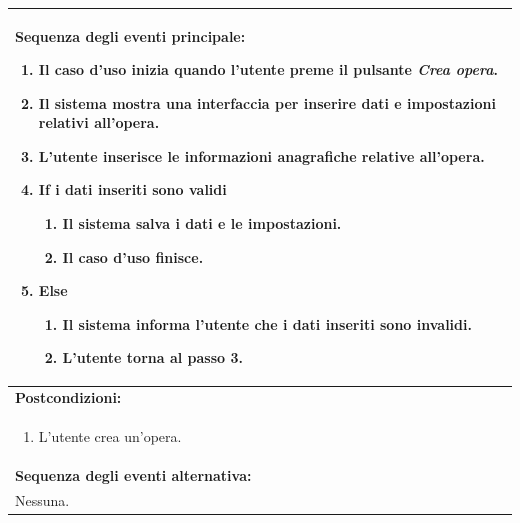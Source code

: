 \documentclass{article}
\begin{document}
\begin{table}[H]
\begin{tabular}{|p{\linewidth}|}
                        \hline
                        \textbf{Sequenza degli eventi principale:}
                        \begin{enumerate}
                            \item Il caso d'uso inizia quando l'utente preme il pulsante \emph{Crea opera}.
                            \item Il sistema mostra una interfaccia per inserire dati e impostazioni relativi all'opera. %
                            \item L'utente inserisce le informazioni anagrafiche relative all'opera.
                            \item \textbf{If} i dati inseriti sono validi
                            \begin{enumerate}
                                \item Il sistema salva i dati e le impostazioni.
                                \item Il caso d'uso finisce.
                            \end{enumerate}
                            \item \textbf{Else}
                            \begin{enumerate}
                                \item Il sistema informa l'utente che i dati inseriti sono invalidi.
                                \item L'utente torna al passo 3.
                            \end{enumerate}
                        \end{enumerate} \\
                        \hline
                        \cellcolor{gray!20}
                        \textbf{Postcondizioni:} \\
                        \cellcolor{gray!20}
                        \begin{minipage}{\linewidth}
                            \begin{enumerate}
                                \item L'utente crea un'opera.
                            \end{enumerate}
                        \end{minipage}
                        \vspace{-10pt} \\
                        \hline
                        \textbf{Sequenza degli eventi alternativa:} \\
                        Nessuna. \\
                        \hline
                    \end{tabular}
                \end{table}
\end{document}
